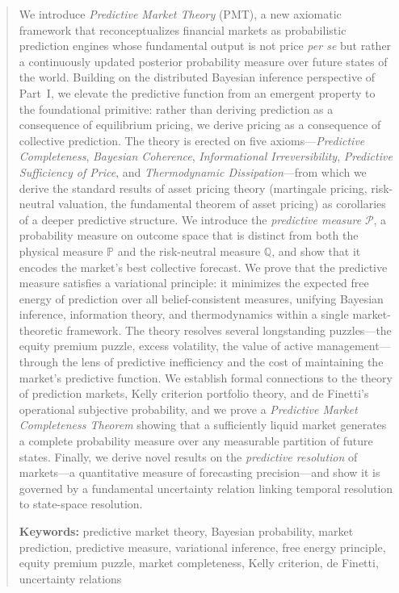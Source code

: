 \documentclass[12pt,a4paper]{article}
\theoremstyle{definition}
\newcommand{\Prob}{\mathbb{P}}
\newcommand{\Q}{\mathbb{Q}}
\newcommand{\PP}{\mathcal{P}}
\begin{document}
\begin{abstract}
\noindent We introduce \emph{Predictive Market Theory} (PMT), a new axiomatic framework that reconceptualizes financial markets as probabilistic prediction engines whose fundamental output is not price \textit{per se} but rather a continuously updated posterior probability measure over future states of the world. Building on the distributed Bayesian inference perspective of Part~I, we elevate the predictive function from an emergent property to the foundational primitive: rather than deriving prediction as a consequence of equilibrium pricing, we derive pricing as a consequence of collective prediction. The theory is erected on five axioms---\textit{Predictive Completeness}, \textit{Bayesian Coherence}, \textit{Informational Irreversibility}, \textit{Predictive Sufficiency of Price}, and \textit{Thermodynamic Dissipation}---from which we derive the standard results of asset pricing theory (martingale pricing, risk-neutral valuation, the fundamental theorem of asset pricing) as corollaries of a deeper predictive structure. We introduce the \emph{predictive measure} $\PP$, a probability measure on outcome space that is distinct from both the physical measure $\Prob$ and the risk-neutral measure $\Q$, and show that it encodes the market's best collective forecast. We prove that the predictive measure satisfies a variational principle: it minimizes the expected free energy of prediction over all belief-consistent measures, unifying Bayesian inference, information theory, and thermodynamics within a single market-theoretic framework. The theory resolves several longstanding puzzles---the equity premium puzzle, excess volatility, the value of active management---through the lens of predictive inefficiency and the cost of maintaining the market's predictive function. We establish formal connections to the theory of prediction markets, Kelly criterion portfolio theory, and de Finetti's operational subjective probability, and we prove a \emph{Predictive Market Completeness Theorem} showing that a sufficiently liquid market generates a complete probability measure over any measurable partition of future states. Finally, we derive novel results on the \emph{predictive resolution} of markets---a quantitative measure of forecasting precision---and show it is governed by a fundamental uncertainty relation linking temporal resolution to state-space resolution.

\medskip
\noindent\textbf{Keywords:} predictive market theory, Bayesian probability, market prediction, predictive measure, variational inference, free energy principle, equity premium puzzle, market completeness, Kelly criterion, de Finetti, uncertainty relations
\end{abstract}
\end{document}
